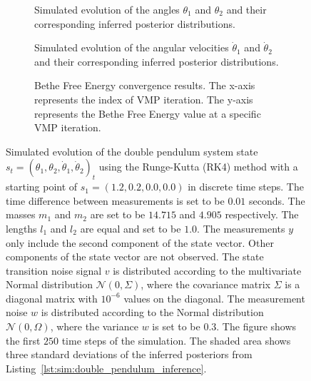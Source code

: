 \begin{figure}
  \centering
  \begin{subfigure}[t]{0.315\textwidth}
    \centering
    \caption{Simulated evolution of the angles $\theta_1$ and $\theta_2$ and their corresponding inferred posterior distributions.}
    \label{fig:sim:pendulum_example_inference_angles}
  \end{subfigure}
  \hfill
  \begin{subfigure}[t]{0.315\textwidth}
    \centering
    \caption{Simulated evolution of the angular velocities $\dot{\theta}_1$ and $\dot{\theta}_2$ and their corresponding inferred posterior distributions.}
    \label{fig:sim:pendulum_example_inference_velocities}
  \end{subfigure}
  \hfill
  \begin{subfigure}[t]{0.315\textwidth}
    \centering
    \caption{Bethe Free Energy convergence results.
      The x-axis represents the index of VMP iteration.
      The y-axis represents the Bethe Free Energy value at a specific VMP iteration.
    }
    \label{fig:sim:pendulum_example_inference_free_energy}
  \end{subfigure}
  \caption{
    Simulated evolution of the double pendulum system state $s_t = (\theta_1, \theta_2, \dot{\theta}_1, \dot{\theta}_2)_t$ using the Runge-Kutta (RK4) method with a starting point of $s_1 = (1.2, 0.2, 0.0, 0.0)$ in discrete time steps.
    The time difference between measurements is set to be $0.01$ seconds.
    The masses $m_1$ and $m_2$ are set to be $14.715$ and $4.905$ respectively.
    The lengths $l_1$ and $l_2$ are equal and set to be $1.0$.
    The measurements $y$ only include the second component of the state vector.
    Other components of the state vector are not observed.
    The state transition noise signal $v$ is distributed according to the multivariate Normal
    distribution $\mathcal{N}(0, \Sigma)$, where the covariance matrix $\Sigma$ is a diagonal
    matrix with $10^{-6}$ values on the diagonal.
    The measurement noise $w$ is distributed according to the Normal distribution
    $\mathcal{N}(0, \Omega)$, where the variance $w$ is set to be $0.3$.
    The figure shows the first $250$ time steps of the simulation.
    The shaded area shows three standard deviations of the inferred posteriors from
    Listing~\ref{lst:sim:double_pendulum_inference}.
  }
  \label{fig:sim:pendulum_example_inference_states}
\end{figure}

